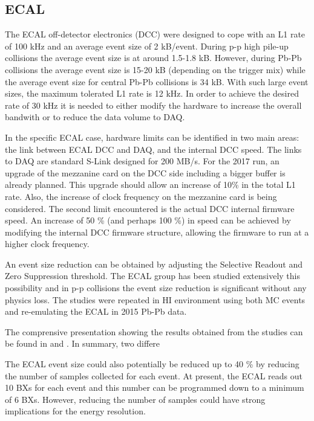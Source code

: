 \subsection{ECAL\label{subsec:ECAL}} 
The ECAL off-detector electronics (DCC) were designed to cope with an L1 rate of 100 kHz and an average event size of 2 kB/event. 
During p-p high pile-up collisions the average event size is at around 1.5-1.8 kB. However, during Pb-Pb collisions the average event size is 15-20 kB (depending on the trigger mix) while the
average event size for central Pb-Pb collisions is 34 kB. With such large event sizes, the maximum tolerated L1 rate is 12 kHz. In order to achieve the desired rate of 30 kHz it is needed to either modify the hardware to increase the overall bandwith or to reduce the data volume to DAQ. 


In the specific ECAL case, hardware limits can be identified in two main areas: the link between ECAL DCC and
DAQ, and the internal DCC speed. The links to DAQ are standard S-Link designed for 200 MB/s. For the 2017 run, an
upgrade of the mezzanine card on the DCC side including a bigger buffer is already planned. This upgrade should allow an
increase of 10\% in the total L1 rate. Also, the increase of clock frequency on the mezzanine card is being considered.
The second limit encountered is the actual DCC internal firmware speed. An increase of 50 \% (and perhaps 100 \%) in
speed can be achieved by modifying the internal DCC firmware structure, allowing the firmware to run at a higher clock
frequency.

An event size reduction can be obtained by adjusting the Selective Readout and Zero
Suppression threshold. The ECAL group has been studied extensively this possibility and in p-p collisions the event size reduction is significant without any physics loss. The studies were repeated in HI environment using both MC events and re-emulating the ECAL in 2015 Pb-Pb data. 

The comprensive presentation showing the results obtained from the studies can be found in \cite{ECALDPG} and \cite{ECALHIN}. In summary, two differe



The ECAL event size could also potentially be reduced up to 40 \% by
reducing the number of samples collected for each event. At present, the ECAL reads out 10 BXs for each event and this
number can be programmed down to a minimum of 6 BXs. However, reducing the number of samples could have strong
implications for the energy resolution. 







